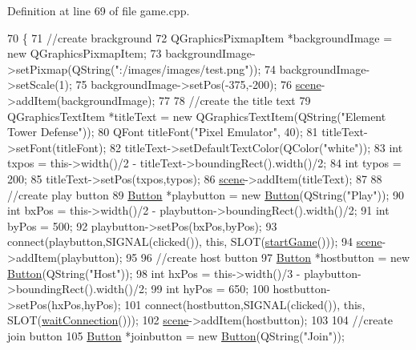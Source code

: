 Definition at line 69 of file game.\+cpp.


\begin{DoxyCode}
70 \{
71     \textcolor{comment}{//create brackground}
72     QGraphicsPixmapItem *backgroundImage = \textcolor{keyword}{new} QGraphicsPixmapItem;
73     backgroundImage->setPixmap(QString(\textcolor{stringliteral}{":/images/images/test.png"}));
74     backgroundImage->setScale(1);
75     backgroundImage->setPos(-375,-200);
76     \hyperlink{class_game_a8119e3b9a632906c6808fa294b46a92a}{scene}->addItem(backgroundImage);
77 
78     \textcolor{comment}{//create the title text}
79     QGraphicsTextItem *titleText = \textcolor{keyword}{new} QGraphicsTextItem(QString(\textcolor{stringliteral}{"Element Tower Defense"}));
80     QFont titleFont(\textcolor{stringliteral}{"Pixel Emulator"}, 40);
81     titleText->setFont(titleFont);
82     titleText->setDefaultTextColor(QColor(\textcolor{stringliteral}{"white"}));
83     \textcolor{keywordtype}{int} txpos = this->width()/2 - titleText->boundingRect().width()/2;
84     \textcolor{keywordtype}{int} typos = 200;
85     titleText->setPos(txpos,typos);
86     \hyperlink{class_game_a8119e3b9a632906c6808fa294b46a92a}{scene}->addItem(titleText);
87 
88     \textcolor{comment}{//create play button}
89     \hyperlink{class_button}{Button} *playbutton = \textcolor{keyword}{new} \hyperlink{class_button}{Button}(QString(\textcolor{stringliteral}{"Play"}));
90     \textcolor{keywordtype}{int} bxPos = this->width()/2 - playbutton->boundingRect().width()/2;
91     \textcolor{keywordtype}{int} byPos = 500;
92     playbutton->setPos(bxPos,byPos);
93     connect(playbutton,SIGNAL(clicked()), \textcolor{keyword}{this}, SLOT(\hyperlink{class_game_ae8638ccdb0ef3bf39a6affa30aa1258f}{startGame}()));
94     \hyperlink{class_game_a8119e3b9a632906c6808fa294b46a92a}{scene}->addItem(playbutton);
95 
96     \textcolor{comment}{//create host button}
97     \hyperlink{class_button}{Button} *hostbutton = \textcolor{keyword}{new} \hyperlink{class_button}{Button}(QString(\textcolor{stringliteral}{"Host"}));
98     \textcolor{keywordtype}{int} hxPos = this->width()/3 - playbutton->boundingRect().width()/2;
99     \textcolor{keywordtype}{int} hyPos = 650;
100     hostbutton->setPos(hxPos,hyPos);
101     connect(hostbutton,SIGNAL(clicked()), \textcolor{keyword}{this}, SLOT(\hyperlink{class_game_a771253a0edc9a31ff64352eb0a4367cb}{waitConnection}()));
102     \hyperlink{class_game_a8119e3b9a632906c6808fa294b46a92a}{scene}->addItem(hostbutton);
103 
104     \textcolor{comment}{//create join button}
105     \hyperlink{class_button}{Button} *joinbutton = \textcolor{keyword}{new} \hyperlink{class_button}{Button}(QString(\textcolor{stringliteral}{"Join"}));

\end{DoxyCode}
